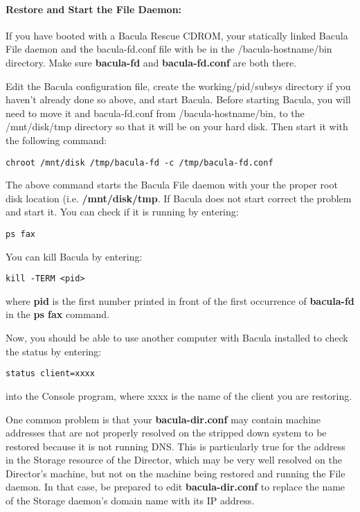 \paragraph*{Restore and Start the File Daemon:}

If you have booted with a Bacula Rescue CDROM, your statically linked Bacula
File daemon and the bacula-fd.conf file with be in the /bacula-hostname/bin
directory. Make sure {\bf bacula-fd} and {\bf bacula-fd.conf} are both there. 

Edit the Bacula configuration file, create the working/pid/subsys directory if
you haven't already done so above, and start Bacula. Before starting Bacula,
you will need to move it and bacula-fd.conf from /bacula-hostname/bin, to the
/mnt/disk/tmp directory so that it will be on your hard disk. Then start it
with the following command: 

\footnotesize
\begin{verbatim}
chroot /mnt/disk /tmp/bacula-fd -c /tmp/bacula-fd.conf
\end{verbatim}
\normalsize

The above command starts the Bacula File daemon with your the proper root disk
location (i.e. {\bf /mnt/disk/tmp}. If Bacula does not start correct the
problem and start it. You can check if it is running by entering: 

\footnotesize
\begin{verbatim}
ps fax
\end{verbatim}
\normalsize

You can kill Bacula by entering: 

\footnotesize
\begin{verbatim}
kill -TERM <pid>
\end{verbatim}
\normalsize

where {\bf pid} is the first number printed in front of the first occurrence
of {\bf bacula-fd} in the {\bf ps fax} command. 

Now, you should be able to use another computer with Bacula installed to check
the status by entering: 

\footnotesize
\begin{verbatim}
status client=xxxx
\end{verbatim}
\normalsize

into the Console program, where xxxx is the name of the client you are
restoring. 

One common problem is that your {\bf bacula-dir.conf} may contain machine
addresses that are not properly resolved on the stripped down system to be
restored because it is not running DNS. This is particularly true for the
address in the Storage resource of the Director, which may be very well
resolved on the Director's machine, but not on the machine being restored and
running the File daemon. In that case, be prepared to edit {\bf
bacula-dir.conf} to replace the name of the Storage daemon's domain name with
its IP address. 


